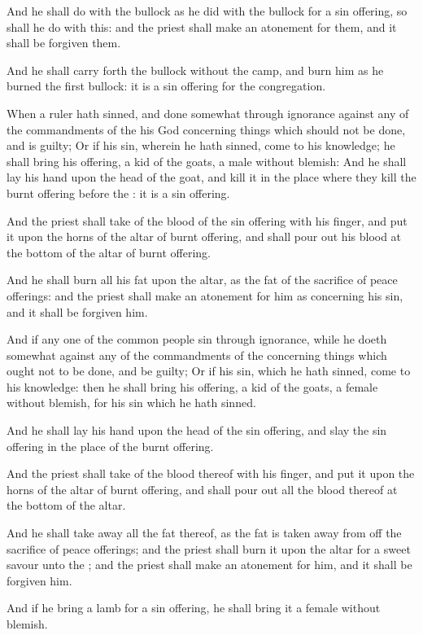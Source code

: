 \Verse And he shall do with the bullock as he did with the bullock for a sin offering, so shall he do with this: and the priest shall make an atonement for them, and it shall be forgiven them.

\Verse And he shall carry forth the bullock without the camp, and burn him as he burned the first bullock: it is a sin offering for the congregation.

\Verse When a ruler hath sinned, and done somewhat through ignorance against any of the commandments of the \LORD his God concerning things which should not be done, and is guilty; \Verse Or if his sin, wherein he hath sinned, come to his knowledge; he shall bring his offering, a kid of the goats, a male without blemish: \Verse And he shall lay his hand upon the head of the goat, and kill it in the place where they kill the burnt offering before the \LORD: it is a sin offering.

\Verse And the priest shall take of the blood of the sin offering with his finger, and put it upon the horns of the altar of burnt offering, and shall pour out his blood at the bottom of the altar of burnt offering.

\Verse And he shall burn all his fat upon the altar, as the fat of the sacrifice of peace offerings: and the priest shall make an atonement for him as concerning his sin, and it shall be forgiven him.

\Verse And if any one of the common people sin through ignorance, while he doeth somewhat against any of the commandments of the \LORD concerning things which ought not to be done, and be guilty; \Verse Or if his sin, which he hath sinned, come to his knowledge: then he shall bring his offering, a kid of the goats, a female without blemish, for his sin which he hath sinned.

\Verse And he shall lay his hand upon the head of the sin offering, and slay the sin offering in the place of the burnt offering.

\Verse And the priest shall take of the blood thereof with his finger, and put it upon the horns of the altar of burnt offering, and shall pour out all the blood thereof at the bottom of the altar.

\Verse And he shall take away all the fat thereof, as the fat is taken away from off the sacrifice of peace offerings; and the priest shall burn it upon the altar for a sweet savour unto the \LORD; and the priest shall make an atonement for him, and it shall be forgiven him.

\Verse And if he bring a lamb for a sin offering, he shall bring it a female without blemish.

